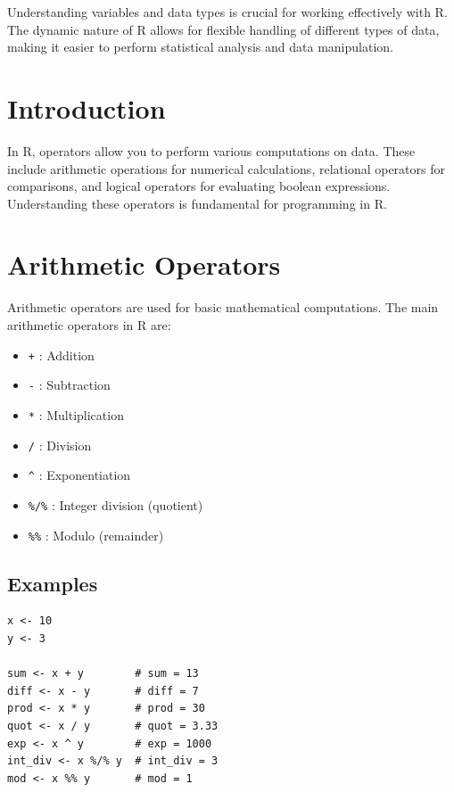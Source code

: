 \documentclass[12pt]{book}
\begin{document}
Understanding variables and data types is crucial for working effectively with R. The dynamic nature of R allows for flexible handling of different types of data, making it easier to perform statistical analysis and data manipulation.







\section{Introduction}
In R, operators allow you to perform various computations on data. These include arithmetic operations for numerical calculations, relational operators for comparisons, and logical operators for evaluating boolean expressions. Understanding these operators is fundamental for programming in R.

\section{Arithmetic Operators}
Arithmetic operators are used for basic mathematical computations. The main arithmetic operators in R are:
\begin{itemize}
    \item \texttt{+} : Addition
    \item \texttt{-} : Subtraction
    \item \texttt{*} : Multiplication
    \item \texttt{/} : Division
    \item \texttt{\^} : Exponentiation
    \item \texttt{\%/\%} : Integer division (quotient)
    \item \texttt{\%\%} : Modulo (remainder)
\end{itemize}



\subsection{Examples}
\begin{verbatim}
x <- 10
y <- 3

sum <- x + y        # sum = 13
diff <- x - y       # diff = 7
prod <- x * y       # prod = 30
quot <- x / y       # quot = 3.33
exp <- x ^ y        # exp = 1000
int_div <- x %/% y  # int_div = 3
mod <- x %% y       # mod = 1
\end{verbatim}
\end{document}
